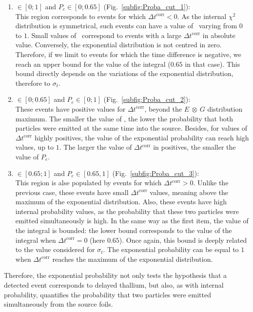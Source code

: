 \begin{enumerate}
\item \Pint$\in[0;1]$ and $P_{e}\in[0;0.65]$ (Fig.~\ref{subfig:Proba_cut_1}):\\
  This region corresponds to events for which $\Delta t^{\text{corr}}<0$.
  As the internal $\chi^{2}$ distribution is symmetrical, such events can have a value of \Pint\ varying from $0$ to $1$.
  Small values of \Pint\ correspond to events with a large $\Delta t^{\text{corr}}$ in absolute value.
  Conversely, the exponential distribution is not centred in zero.
  Therefore, if we limit to events for which the time difference is negative, we reach an upper bound for the value of the integral ($0.65$ in that case).
  This bound directly depends on the variations of the exponential distribution, therefore to $\sigma_{t}$.
\item \Pint$\in[0;0.65]$ and $P_{e}\in[0;1]$ (Fig.~\ref{subfig:Proba_cut_2}):\\
  These events have positive values for $\Delta t^{\text{corr}}$, beyond the $E~\otimes~G$ distribution maximum.
  The smaller the value of \Pint, the lower the probability that both particles were emitted at the same time into the source.
  Besides, for values of $\Delta t^{\text{corr}}$ highly positives, the value of the exponential probability can reach high values, up to $1$.
  The larger the value of $\Delta t^{\text{corr}}$ in positives, the smaller the value of $P_{e}$.
\item \Pint$\in[0.65;1]$ and $P_{e}\in[0.65,1]$ (Fig.~\ref{subfig:Proba_cut_3}):\\
  This region is alse populated by events for which $\Delta t^{\text{corr}}>0$.
  Unlike the previous case, these events have small $\Delta t^{\text{corr}}$ values, meaning above the maximum of the exponential distribution.
  Also, these events have high internal probability values, as the probability that these two particles were emitted simultaneously is high.
  In the same way as the first item, the value of the integral is bounded: the lower bound corresponds to the value of the integral when $\Delta t^{\text{corr}}=0$ (here $0.65$).
  Once again, this bound is deeply related to the value considered for $\sigma_{t}$.
  The exponential probability can be equal to $1$ when $\Delta t^{\text{corr}}$ reaches the maximum of the exponential distribution.
\end{enumerate}
Therefore, the exponential probability not only tests the hypothesis that a detected event corresponds to delayed thallium, but also, as with internal probability, quantifies the probability that two particles were emitted simultaneously from the source foils.

